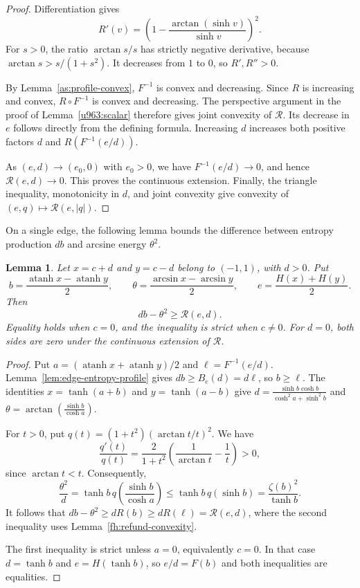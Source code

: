 \documentclass[11pt,letterpaper]{amsart}
\newcommand{\1}{\mathbf 1}
\DeclareMathOperator{\atanh}{atanh}
\newtheorem{lemma}[theorem]{Lemma}
\numberwithin{equation}{section}
\begin{document}
\begin{proof}
Differentiation gives
\[
 R'(v)=
 \left(1-\frac{\arctan(\sinh v)}{\sinh v}\right)^2.
\]
For $s>0$, the ratio $\arctan s/s$ has strictly negative
derivative, because
$\arctan s>s/(1+s^2)$.
It decreases from $1$ to $0$, so $R',R''>0$.

By Lemma~\ref{as:profile-convex}, $F^{-1}$ is convex and
decreasing.
Since $R$ is increasing and convex,
$R\circ F^{-1}$ is convex and decreasing.
The perspective argument in the proof of
Lemma~\ref{u963:scalar} therefore gives joint convexity of
$\mathcal R$.
Its decrease in $e$ follows directly from the defining formula.
Increasing $d$ increases both positive factors
$d$ and $R(F^{-1}(e/d))$.

As $(e,d)\to(e_0,0)$ with $e_0>0$, we have
$F^{-1}(e/d)\to0$, and hence $\mathcal R(e,d)\to0$.
This proves the continuous extension.
Finally, the triangle inequality, monotonicity in $d$,
and joint convexity give convexity of
$(e,q)\mapsto\mathcal R(e,|q|)$.
\end{proof}

On a single edge, the following lemma bounds the difference
between entropy production $db$ and arcsine energy $\theta^2$.

\begin{lemma}\label{fh:edge-inequality}
Let $x=c+d$ and $y=c-d$ belong to $(-1,1)$, with $d>0$.
Put
\[
 b=\frac{\atanh x-\atanh y}{2},
 \qquad
 \theta=\frac{\arcsin x-\arcsin y}{2},
 \qquad
 e=\frac{H(x)+H(y)}2.
\]
Then
\[
 db-\theta^2\ge\mathcal R(e,d).
\]
Equality holds when $c=0$, and the inequality is strict
when $c\ne0$.
For $d=0$, both sides are zero under the continuous extension
of $\mathcal R$.
\end{lemma}

\begin{proof}
Put $a=(\atanh x+\atanh y)/2$ and
$\ell=F^{-1}(e/d)$.
Lemma~\ref{lem:edge-entropy-profile} gives
$db\ge B_e(d)=d\ell$, so $b\ge\ell$.
The identities $x=\tanh(a+b)$ and $y=\tanh(a-b)$ give
$d=\frac{\sinh b\cosh b}{\cosh^2a+\sinh^2b}$ and 
$\theta=\arctan\left(\frac{\sinh b}{\cosh a}\right)$.

For $t>0$, put
$q(t)=(1+t^2)(\arctan t/t)^2$.
We have
\[
 \frac{q'(t)}{q(t)}
 =\frac{2}{1+t^2}
   \left(\frac1{\arctan t}-\frac1t\right)>0,
\]
since $\arctan t<t$.
Consequently,
\[
 \frac{\theta^2}{d}
 =\tanh b\,q\left(\frac{\sinh b}{\cosh a}\right)
 \le\tanh b\,q(\sinh b)
 =\frac{\zeta(b)^2}{\tanh b}.
\]
It follows that
$db-\theta^2\ge dR(b)\ge dR(\ell)=\mathcal R(e,d)$,
where the second inequality uses
Lemma~\ref{fh:refund-convexity}.

The first inequality is strict unless $a=0$, equivalently
$c=0$.
In that case $d=\tanh b$ and $e=H(\tanh b)$,
so $e/d=F(b)$ and both inequalities are equalities.
\end{proof}
\end{document}
